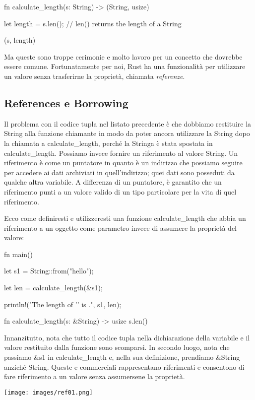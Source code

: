 \documentclass[11pt,a4paper]{article}
\begin{document}
{\begin{rust}
fn calculate_length(s: String) -> (String, usize) {
    let length = s.len(); // len() returns the length of a String

    (s, length)
}
\end{rust}

Ma queste sono troppe cerimonie e molto lavoro per un concetto che dovrebbe essere comune. Fortunatamente per noi, Rust ha una funzionalità per utilizzare un valore senza trasferirne la proprietà, chiamata \textit{referenze}.

\subsection{References e Borrowing}

Il problema con il codice tupla nel listato precedente è che dobbiamo restituire la String alla funzione chiamante in modo da poter ancora utilizzare la String dopo la chiamata a calculate\_length, perché la Stringa è stata spostata in calculate\_length. Possiamo invece fornire un riferimento al valore String. Un riferimento è come un puntatore in quanto è un indirizzo che possiamo seguire per accedere ai dati archiviati in quell'indirizzo; quei dati sono posseduti da qualche altra variabile. A differenza di un puntatore, è garantito che un riferimento punti a un valore valido di un tipo particolare per la vita di quel riferimento.

Ecco come definiresti e utilizzeresti una funzione calculate\_length che abbia un riferimento a un oggetto come parametro invece di assumere la proprietà del valore:

\begin{rust}
fn main() {
    let s1 = String::from("hello");

    let len = calculate_length(&s1);

    println!("The length of '{}' is {}.", s1, len);
}

fn calculate_length(s: &String) -> usize {
    s.len()
}

\end{rust}

Innanzitutto, nota che tutto il codice tupla nella dichiarazione della variabile e il valore restituito dalla funzione sono scomparsi. In secondo luogo, nota che passiamo \&s1 in calculate\_length e, nella sua definizione, prendiamo \&String anziché String. Queste e commerciali rappresentano riferimenti e consentono di fare riferimento a un valore senza assumersene la proprietà.
\begin{center}
\texttt{[image: images/ref01.png]}
\end{center}

}
\end{document}
